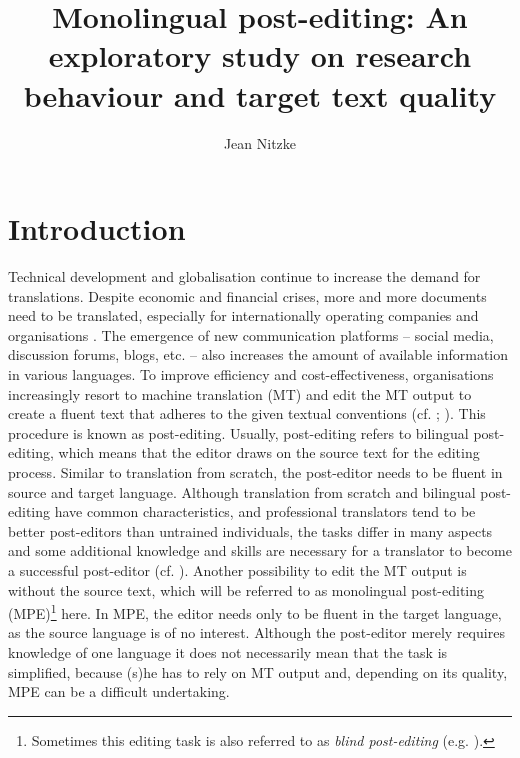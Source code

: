 \documentclass[output=paper]{langsci/langscibook}
\author{Jean Nitzke\affiliation{Johannes Gutenberg University of Mainz in Germersheim}
}
\title{Monolingual post-editing: {A}n exploratory study on research behaviour and target text quality}
\begin{document}
 
    



\section{Introduction\label{nitzke:sec:Introduction}}

Technical development and globalisation continue to increase the demand for translations. Despite economic and financial crises, more and more documents need to be translated, especially for internationally operating companies and organisations \citep{Schmitt2003, DePalma2009}. The emergence of new communication platforms -- social media, discussion forums, blogs, etc. -- also increases the amount of available information in various languages. To improve efficiency and cost-effectiveness, organisations increasingly resort to machine translation (MT) and edit the MT output to create a fluent text that adheres to the given textual conventions (cf. \citealt{obrien2011}; \citealt{Elsen2012}). This procedure is known as post-editing. Usually, post-editing refers to bilingual post-editing, which means that the editor draws on the source text for the editing process. Similar to translation from scratch, the post-editor needs to be fluent in source and target language. Although translation from scratch and bilingual post-editing have common characteristics, and professional translators tend to be better post-editors than untrained individuals, the tasks differ in many aspects and some additional knowledge and skills are necessary for a translator to become a successful post-editor (cf. \citealt{obrien2002}). Another possibility to edit the MT output is without the source text, which will be referred to as monolingual post-editing (MPE)\footnote{Sometimes this editing task is also referred to as \textit{blind post-editing }(e.g. \citealt{carl2013}).} here. In MPE, the editor needs only to be fluent in the target language, as the source language is of no interest. Although the post-editor merely requires knowledge of one language it does not necessarily mean that the task is simplified, because (s)he has to rely on MT output and, depending on its quality, MPE can be a difficult undertaking.
\end{document}
